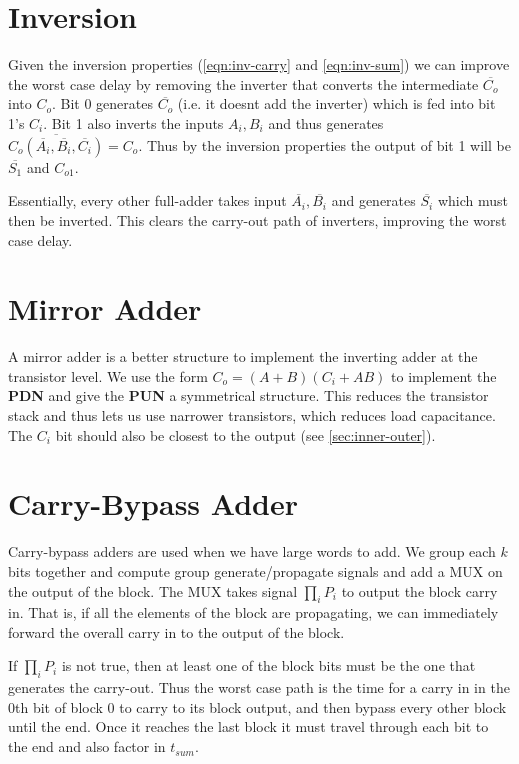 \documentclass[11pt]{report}
\begin{document}
\section{Inversion}
Given the inversion properties (\autoref{eqn:inv-carry} and \autoref{eqn:inv-sum}) we can improve the worst case delay by removing the inverter that converts the intermediate $\overline{C_o}$ into $C_o$. Bit 0 generates $\overline{C_o}$ (i.e. it doesnt add the inverter) which is fed into bit 1's $C_i$. Bit 1 also inverts the inputs $A_i, B_i$ and thus generates $\overline{C_o(\overline{A_i}, \overline{B_i}, \overline{C_i})} = C_o$. Thus by the inversion properties the output of bit 1 will be $\overline{S_1}$ and $C_{o1}$.

Essentially, every other full-adder takes input $\overline{A_i}, \overline{B_i}$ and generates $\overline{S_i}$ which must then be inverted. This clears the carry-out path of inverters, improving the worst case delay.

\section{Mirror Adder}
A mirror adder is a better structure to implement the inverting adder at the transistor level. We use the form $C_o = (A + B)(C_i + AB)$ to implement the \textbf{PDN} and give the \textbf{PUN} a symmetrical structure. This reduces the transistor stack and thus lets us use narrower transistors, which reduces load capacitance. The $C_i$ bit should also be closest to the output (see \autoref{sec:inner-outer}).

\section{Carry-Bypass Adder}
Carry-bypass adders are used when we have large words to add. We group each $k$ bits together and compute group generate/propagate signals and add a MUX on the output of the block. The MUX takes signal $\prod_i P_i$ to output the block carry in. That is, if all the elements of the block are propagating, we can immediately forward the overall carry in to the output of the block.

If $\prod_i P_i$ is not true, then at least one of the block bits must be the one that generates the carry-out. Thus the worst case path is the time for a carry in in the 0th bit of block 0 to carry to its block output, and then bypass every other block until the end. Once it reaches the last block it must travel through each bit to the end and also factor in $t_{sum}$.
\end{document}
